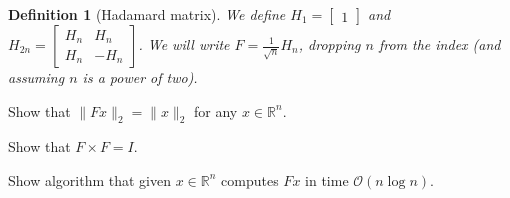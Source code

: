 \documentclass[12pt]{uebung}
\newtheorem{definition}{Definition}
\begin{document}
 

\newcommand{\bigo}{\mathcal{O}}
\renewcommand{\aufgname}{Exercise}

\begin{definition}[Hadamard matrix]
We define $H_1 = \begin{bmatrix} 1 \end{bmatrix}$ and $H_{2n} = \begin{bmatrix} H_n & H_n \\ H_n & -H_n \end{bmatrix}$. We will write $F = \frac{1}{\sqrt{n}} H_n$, dropping $n$ from the index (and assuming $n$ is a power of two).
\end{definition}

\begin{aufg}
Show that $\|F x\|_2 = \|x\|_2$ for any $x \in \mathbb{R}^n$.
\end{aufg}

\begin{aufg}
Show that $F \times F = I$.
\end{aufg}

\begin{aufg}
Show algorithm that given $x \in \mathbb{R}^n$ computes $Fx$ in time $\bigo(n \log n)$.
\end{aufg}
\end{document}
